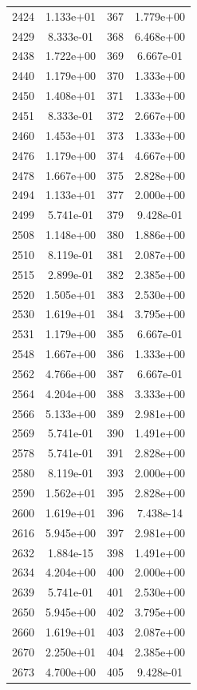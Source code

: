 \documentclass[12pt]{article}
\begin{document}
\begin{longtable}{@{}cccc@{}}
2424 & 1.133e+01 & 367 & 1.779e+00 \\
2429 & 8.333e-01 & 368 & 6.468e+00 \\
2438 & 1.722e+00 & 369 & 6.667e-01 \\
2440 & 1.179e+00 & 370 & 1.333e+00 \\
2450 & 1.408e+01 & 371 & 1.333e+00 \\
2451 & 8.333e-01 & 372 & 2.667e+00 \\
2460 & 1.453e+01 & 373 & 1.333e+00 \\
2476 & 1.179e+00 & 374 & 4.667e+00 \\
2478 & 1.667e+00 & 375 & 2.828e+00 \\
2494 & 1.133e+01 & 377 & 2.000e+00 \\
2499 & 5.741e-01 & 379 & 9.428e-01 \\
2508 & 1.148e+00 & 380 & 1.886e+00 \\
2510 & 8.119e-01 & 381 & 2.087e+00 \\
2515 & 2.899e-01 & 382 & 2.385e+00 \\
2520 & 1.505e+01 & 383 & 2.530e+00 \\
2530 & 1.619e+01 & 384 & 3.795e+00 \\
2531 & 1.179e+00 & 385 & 6.667e-01 \\
2548 & 1.667e+00 & 386 & 1.333e+00 \\
2562 & 4.766e+00 & 387 & 6.667e-01 \\
2564 & 4.204e+00 & 388 & 3.333e+00 \\
2566 & 5.133e+00 & 389 & 2.981e+00 \\
2569 & 5.741e-01 & 390 & 1.491e+00 \\
2578 & 5.741e-01 & 391 & 2.828e+00 \\
2580 & 8.119e-01 & 393 & 2.000e+00 \\
2590 & 1.562e+01 & 395 & 2.828e+00 \\
2600 & 1.619e+01 & 396 & 7.438e-14 \\
2616 & 5.945e+00 & 397 & 2.981e+00 \\
2632 & 1.884e-15 & 398 & 1.491e+00 \\
2634 & 4.204e+00 & 400 & 2.000e+00 \\
2639 & 5.741e-01 & 401 & 2.530e+00 \\
2650 & 5.945e+00 & 402 & 3.795e+00 \\
2660 & 1.619e+01 & 403 & 2.087e+00 \\
2670 & 2.250e+01 & 404 & 2.385e+00 \\
2673 & 4.700e+00 & 405 & 9.428e-01 \\

\end{longtable}
\end{document}

